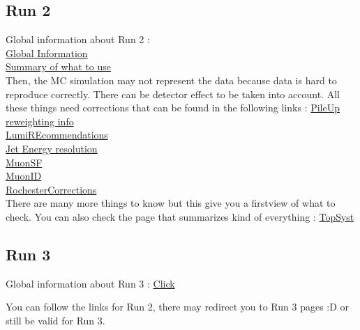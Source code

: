 \documentclass[reprint, a4paper, nofootinbib, amsmath, amssymb, aps]{revtex4-1}
\begin{document}
\subsection{Run 2}
    Global information about Run 2 : \\
    \href{https://twiki.cern.ch/twiki/bin/view/CMS/PdmVRun2LegacyAnalysis}{Global Information} \\
    \href{https://twiki.cern.ch/twiki/bin/viewauth/CMS/PdmVAnalysisSummaryTable}{Summary of what to use} \\
    Then, the MC simulation may not represent the data because data is hard to reproduce correctly. There can be detector effect to be taken into account. All these things need corrections that can be found in the following links : 
    \href{https://twiki.cern.ch/twiki/bin/view/CMS/PileupJetIDUL#Recommendations_for_2018_UL_data}{PileUp reweighting info} \\
    \href{https://twiki.cern.ch/twiki/bin/view/CMS/LumiRecommendationsRun2}{LumiREcommendations} \\
    \href{https://twiki.cern.ch/twiki/bin/view/CMSPublic/WorkBookJetEnergyResolution}{Jet Energy resolution} \\
    \href{https://indico.cern.ch/event/1247210/sessions/478562/attachments/2587866/4465075/MuonPOG_tutorial_part2.pdf}{MuonSF} \\
    \href{https://twiki.cern.ch/twiki/bin/viewauth/CMS/SWGuideMuonIdRun2}{MuonID} \\
    \href{https://twiki.cern.ch/twiki/bin/view/CMS/RochcorMuon}{RochesterCorrections}\\
    There are many more things to know but this give you a firstview of what to check. You can also check the page that summarizes kind of everything : \href{https://twiki.cern.ch/twiki/bin/view/CMS/TopSystematics}{TopSyst} 
    
\subsection{Run 3}
    Global information about Run 3 : \href{https://twiki.cern.ch/twiki/bin/view/CMS/PdmVRun3Analysis#Run_3_Analysis}{Click}

    You can follow the links for Run 2, there may redirect you to Run 3 pages :D or still be valid for Run 3.
\end{document}
